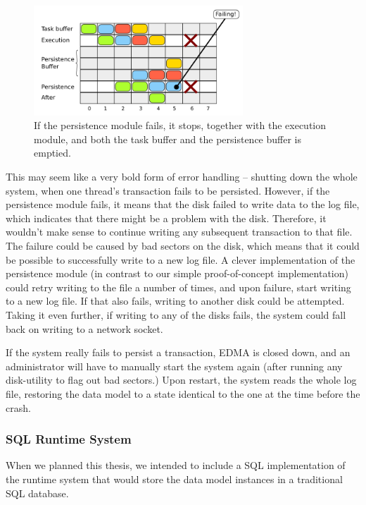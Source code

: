 \begin{figure}[h]
	\centering
	\includegraphics[width=0.7\textwidth]{img/executionPipelineFailing.png}
	\caption{If the persistence module fails, it stops, together with the execution module, and both the task buffer and the persistence buffer is emptied.}
	\label{fig:executionPipelineFailing}
\end{figure}

This may seem like a very bold form of error handling -- shutting
down the whole system, when one thread's transaction fails to be persisted.
However, if the persistence module fails, it means that the disk failed
to write data to the log file, which indicates that there might be
a problem with the disk. Therefore, it wouldn't make sense to continue
writing any subsequent transaction to that file. The failure could
be caused by bad sectors on the disk, which means that it could be
possible to successfully write to a new log file. A clever implementation
of the persistence module (in contrast to our simple proof-of-concept
implementation) could retry writing to the file a number of times,
and upon failure, start writing to a new log file. If that also fails,
writing to another disk could be attempted. Taking it even further,
if writing to any of the disks fails, the system could fall back on
writing to a network socket.

If the system really fails to persist a transaction, EDMA is closed
down, and an administrator will have to manually start the system
again (after running any disk-utility to flag out bad sectors.) Upon
restart, the system reads the whole log file, restoring the data model
to a state identical to the one at the time before the crash.


\subsubsection{SQL Runtime System}

When we planned this thesis, we intended to include a SQL implementation
of the runtime system that would store the data model instances in
a traditional SQL database. 

